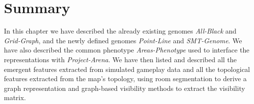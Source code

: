\section{Summary}
In this chapter we have described the already existing genomes \textit{All-Black} and \textit{Grid-Graph}, and the newly defined genomes \textit{Point-Line} and \textit{SMT-Genome}. We have also described the common phenotype \textit{Areas-Phenotype} used to interface the representations with \textit{Project-Arena}. We have then listed and described all the emergent features extracted from simulated gameplay data and all the topological features extracted from the map's topology, using room segmentation to derive a graph representation and graph-based visibility methods to extract the visibility matrix.